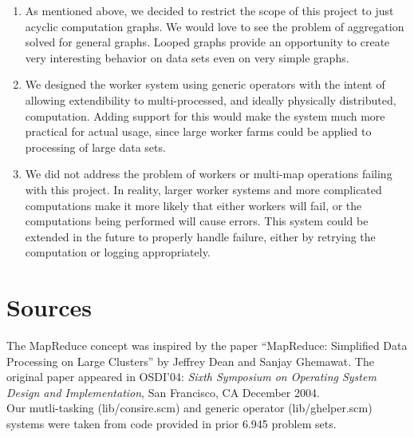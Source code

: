 \documentclass{article}
\begin{document}
\begin{enumerate}
\item As mentioned above, we decided to restrict the scope of this project to just
  acyclic computation graphs. We would love to see the problem of aggregation
  solved for general graphs. Looped graphs provide an opportunity to create
  very interesting behavior on data sets even on very simple graphs.
\item We designed the worker system using generic operators with the intent of
  allowing extendibility to multi-processed, and ideally physically distributed,
  computation. Adding support for this would make the system much more practical
  for actual usage, since large worker farms could be applied to processing of
  large data sets.
\item We did not address the problem of workers or multi-map operations failing
  with this project. In reality, larger worker systems and more complicated
  computations make it more likely that either workers will fail, or the computations
  being performed will cause errors. This system could be extended in the future
  to properly handle failure, either by retrying the computation or logging
  appropriately.
\end{enumerate}

\section{Sources}

The MapReduce concept was inspired by the paper ``MapReduce:
Simplified Data Processing on Large Clusters'' by Jeffrey Dean and
Sanjay Ghemawat. The original paper appeared in OSDI'04: \emph{ Sixth
Symposium on Operating System Design and Implementation}, San
Francisco, CA December 2004.\\

Our mutli-tasking (lib/consire.scm) and generic operator
(lib/ghelper.scm) systems were taken from code provided in prior 6.945 problem sets.
\end{document}
